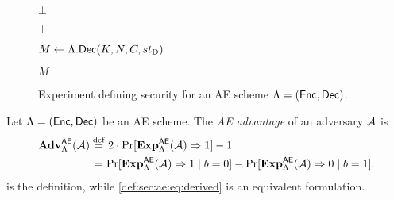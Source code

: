 \begin{figure}
\begin{adjustbox}{margin*=2ex,width=0.997\textwidth,frame,center}
\begin{minipage}[t]{0.40\textwidth}
\begin{algorithmic}[1]
			
				\State \Return $\bot$
			\EndIf

			\State
		

				\State \Return $\bot$
			\EndIf
			
			\State
			\State $M \gets \Lambda.\mathsf{Dec}(K, N, C, st_{\mathrm{D}})$
			
			\State
			\State \Return $M$
		\end{algorithmic}
	\end{minipage}
\end{adjustbox}

\caption{Experiment defining security for an AE scheme \mbox{$\Lambda = (\mathsf{Enc}, \mathsf{Dec})$}.}
\label{fig:AE_security_experiment}

\end{figure}


\begin{definition}[AE security]\label{def:sec:ae}
Let $\Lambda = (\mathsf{Enc}, \mathsf{Dec})$ be an AE scheme. 
The \emph{AE advantage} of an adversary $\mathcal{A}$ is 
\begin{align}
	\mathbf{Adv}_{\Lambda}^{\mathsf{AE}}(\mathcal{A}) 
		&\overset{\mathrm{def}}{=} 2 \cdot \Pr[ \mathbf{Exp}_{\Lambda}^{\mathsf{AE}}(\mathcal{A}) \Rightarrow 1] - 1 \label{def:sec:ae:eq:definition}  \\ 
		&\hspace*{1.6pt}= 
		\Pr[ \mathbf{Exp}_{\Lambda}^{\mathsf{AE}}(\mathcal{A}) \Rightarrow 1 \mid b = 0] 
			- \Pr[ \mathbf{Exp}_{\Lambda}^{\mathsf{AE}}(\mathcal{A}) \Rightarrow 0 \mid b = 1] . \label{def:sec:ae:eq:derived}
\end{align}
 is the definition,
while \eqref{def:sec:ae:eq:derived} is an equivalent formulation.
\end{definition}


